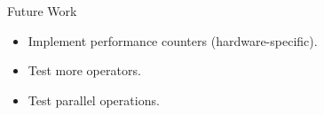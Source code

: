 \begin{block}{Future Work}
  \begin{itemize}
  \item Implement performance counters (hardware-specific).
  \item Test more operators.
  \item Test parallel operations.
  \end{itemize}
\end{block}

